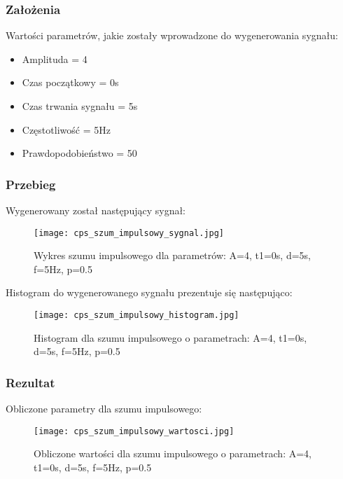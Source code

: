 \documentclass[12pt]{article}
\begin{document}
\subsubsection{Założenia}
Wartości parametrów, jakie zostały wprowadzone do wygenerowania sygnału:
\begin{itemize}
    \item Amplituda = 4
    \item Czas początkowy = 0s
    \item Czas trwania sygnału = 5s
    \item Częstotliwość = 5Hz
    \item Prawdopodobieństwo = 50%
\end{itemize}
\subsubsection{Przebieg}
Wygenerowany został następujący sygnał:
\begin{figure}[H]
    \centering
    \texttt{[image: cps\_szum\_impulsowy\_sygnal.jpg]}
    \caption{Wykres szumu impulsowego dla parametrów:  A=4, t1=0s, d=5s, f=5Hz, p=0.5}
    \label{wykres dla eksperymentu 1}
\end{figure}

Histogram do wygenerowanego sygnału prezentuje się następująco:
\begin{figure}[H]
    \centering
    \texttt{[image: cps\_szum\_impulsowy\_histogram.jpg]}
    \caption{Histogram dla szumu impulsowego o parametrach:  A=4, t1=0s, d=5s, f=5Hz, p=0.5}
    \label{histogram dla eksperymentu 1}
\end{figure}

\newpage

\subsubsection{Rezultat}
Obliczone parametry dla szumu impulsowego:
\begin{figure}[H]
    \centering
    \texttt{[image: cps\_szum\_impulsowy\_wartosci.jpg]}
    \caption{Obliczone wartości dla szumu impulsowego o parametrach:  A=4, t1=0s, d=5s, f=5Hz, p=0.5 }
    \label{Wartości dla eksperymentu 1}
\end{figure}



\end{document}
